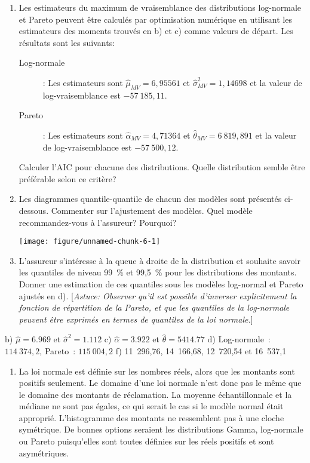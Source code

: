 \begin{exercice}
\begin{enumerate}
\item Les estimateurs du maximum de vraisemblance des distributions log-normale et Pareto peuvent être calculés par optimisation numérique en utilisant les estimateurs des moments trouvés en b) et c) comme valeurs de départ. Les résultats sont les suivants:
\begin{description}
\item[Log-normale]: Les estimateurs sont $\hat\mu_{MV}=6,95561$ et $\hat\sigma^2_{MV}=1,14698$ et la valeur de log-vraisemblance est $-57~185,11$.
\item[Pareto]: Les estimateurs sont $\hat\alpha_{MV}=4,71364$ et $\hat\theta_{MV}=6~819,891$ et la valeur de log-vraisemblance est $-57~500,12$.
\end{description}
Calculer l'AIC pour chacune des distributions. Quelle distribution semble être préférable selon ce critère?

\item Les diagrammes quantile-quantile de chacun des modèles sont présentés ci-dessous. Commenter sur l'ajustement des modèles. Quel modèle recommandez-vous à l'assureur? Pourquoi?

\begin{knitrout}
\color{fgcolor}
\texttt{[image: figure/unnamed-chunk-6-1]} 

\end{knitrout}

\item L'assureur s'intéresse à la queue à droite de la distribution et souhaite savoir les quantiles de niveau 99~\% et 99,5~\% pour les distributions des montants. Donner une estimation de ces quantiles sous les modèles log-normal et Pareto ajustés en d). [\emph{Astuce: Observer qu'il est possible d'inverser explicitement la fonction de répartition de la Pareto, et que les quantiles de la log-normale peuvent être exprimés en termes de quantiles de la loi normale.}]

\end{enumerate}
\begin{rep}
b) $\hat \mu =6.969$ et $\hat\sigma^2 =1.112$ 
c) $\hat\alpha =3.922$ et 
$\hat\theta=5414.77$
d) Log-normale~: $114~374,2$, Pareto~: $115~004,2$
f) 11~296,76,  14~166,68,  12~720,54  et  16~537,1
\end{rep}
\begin{sol}
\begin{enumerate}

\item La loi normale est définie sur les nombres réels, alors que les montants sont positifs seulement. Le domaine d'une loi normale n'est donc pas le même que le domaine des montants de réclamation. La moyenne échantillonnale et la médiane ne sont pas égales, ce qui serait le cas si le modèle normal était approprié. L'histogramme des montants ne ressemblent pas à une cloche symétrique. De bonnes options seraient les distributions Gamma, log-normale ou Pareto puisqu'elles sont toutes définies sur les réels positifs et sont asymétriques.


\end{enumerate}
\end{sol}
\end{exercice}
